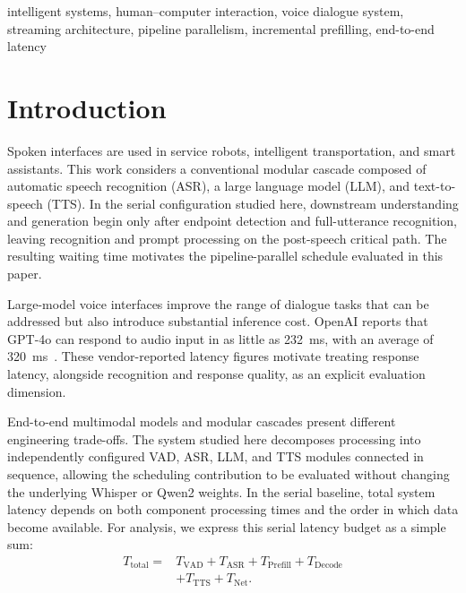 \documentclass[conference]{IEEEtran}
\begin{document}
\begin{IEEEkeywords}
intelligent systems, human--computer interaction, voice dialogue system, streaming architecture, pipeline parallelism, incremental prefilling, end-to-end latency
\end{IEEEkeywords}

\section{Introduction}\label{sec:intro}

Spoken interfaces are used in service robots, intelligent transportation, and smart assistants. This work considers a conventional modular cascade composed of automatic speech recognition (ASR), a large language model (LLM), and text-to-speech (TTS). In the serial configuration studied here, downstream understanding and generation begin only after endpoint detection and full-utterance recognition, leaving recognition and prompt processing on the post-speech critical path. The resulting waiting time motivates the pipeline-parallel schedule evaluated in this paper.

Large-model voice interfaces improve the range of dialogue tasks that can be addressed but also introduce substantial inference cost. OpenAI reports that GPT-4o can respond to audio input in as little as 232~ms, with an average of 320~ms~\cite{ref1}. These vendor-reported latency figures motivate treating response latency, alongside recognition and response quality, as an explicit evaluation dimension.

End-to-end multimodal models and modular cascades present different engineering trade-offs. The system studied here decomposes processing into independently configured VAD, ASR, LLM, and TTS modules connected in sequence, allowing the scheduling contribution to be evaluated without changing the underlying Whisper or Qwen2 weights. In the serial baseline, total system latency depends on both component processing times and the order in which data become available. For analysis, we express this serial latency budget as a simple sum:
\begin{align}
T_{\mathrm{total}} ={}& T_{\mathrm{VAD}} + T_{\mathrm{ASR}} + T_{\mathrm{Prefill}} + T_{\mathrm{Decode}} \nonumber\\
& + T_{\mathrm{TTS}} + T_{\mathrm{Net}}.
\label{eq:total}
\end{align}
\end{document}
